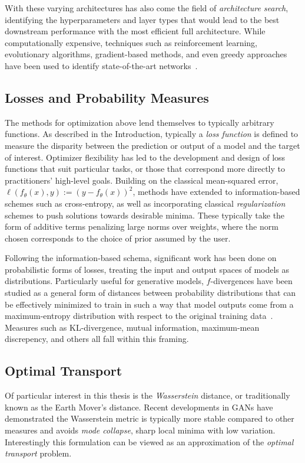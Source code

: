 With these varying architectures
has also come the field of \textit{architecture search},
identifying the hyperparameters and layer types
that would lead to the best downstream performance
with the most efficient full architecture.
While computationally expensive, techniques
such as reinforcement learning, evolutionary algorithms,
gradient-based methods, and even greedy approaches
have been used to identify state-of-the-art networks~\citep{elsken2019neural}.

\subsection{Losses and Probability Measures}
The methods for optimization above
lend themselves to typically arbitrary functions.
As described in the Introduction,
typically a \textit{loss function}
is defined to measure the disparity
between the prediction or output of a model
and the target of interest.
Optimizer flexibility has led
to the development and design of loss functions
that suit particular tasks,
or those that correspond more directly
to practitioners' high-level goals.
Building on the classical mean-squared error,
$\ell(f_\theta(x), y) := (y - f_\theta(x))^2$,
methods have extended to information-based schemes
such as cross-entropy, as well as 
incorporating classical \textit{regularization} schemes
to push solutions towards desirable minima.
These typically take the form of additive terms 
penalizing large norms over weights, where
the norm chosen corresponds to the choice of 
prior assumed by the user.

Following the information-based schema,
significant work has been done
on probabilistic forms of losses,
treating the input and output spaces
of models as distributions.
Particularly useful for generative models,
$f$-divergences have been studied
as a general form of distances
between probability distributions
that can be effectively minimized to
train in such a way that model outputs
come from a maximum-entropy distribution
with respect to the original training data~\citep{fgan}.
Measures such as KL-divergence, mutual information,
maximum-mean discrepency, and others all fall within
this framing.

\subsection{Optimal Transport}	
Of particular interest in this thesis is the \textit{Wasserstein} distance,
or traditionally known as the Earth Mover's distance.
Recent developments in GANs \citep{wgan} have demonstrated
the Wasserstein metric is typically more stable
compared to other measures and avoids
\textit{mode collapse}, sharp local minima 
with low variation. Interestingly
this formulation can be viewed as an approximation
of the \textit{optimal transport} problem.

